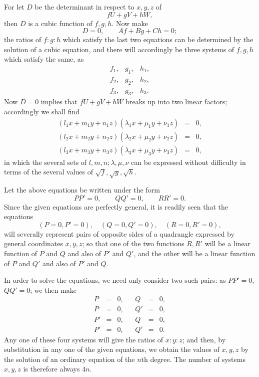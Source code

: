 \documentclass[11pt]{article}
\newcommand{\sourcepage}[1]{\marginpar{\scriptsize p.~#1}}
\begin{document}
{{For let $D$ be the determinant in respect to $x,y,z$ of
\[
 fU+gV+hW,
\]
then $D$ is a cubic function of $f,g,h$. Now make
\[
 D=0,\qquad Af+Bg+Ch=0;
\]
the ratios of $f:g:h$ which satisfy the last two equations can be determined by the solution of a cubic equation, and there will accordingly be three systems of $f,g,h$ which satisfy the same, as
\[
\begin{array}{ccc}
 f_1,&g_1,&h_1,\\
 f_2,&g_2,&h_2,\\
 f_3,&g_3,&h_3.
\end{array}
\]
Now $D=0$ implies that $fU+gV+hW$ breaks up into two linear factors; accordingly we shall find
\[
\begin{array}{rcl}
(l_1x+m_1y+n_1z)(\lambda_1x+\mu_1y+\nu_1z)&=&0,\\
(l_2x+m_2y+n_2z)(\lambda_2x+\mu_2y+\nu_2z)&=&0,\\
(l_3x+m_3y+n_3z)(\lambda_3x+\mu_3y+\nu_3z)&=&0,
\end{array}
\]
\sourcepage{153}
in which the several sets of $l,m,n;\lambda,\mu,\nu$ can be expressed without difficulty in terms of the several values of $\sqrt f,\sqrt g,\sqrt h$.

Let the above equations be written under the form
\[
 PP'=0,\qquad QQ'=0,\qquad RR'=0.
\]
Since the given equations are perfectly general, it is readily seen that the equations
\[
(P=0,P'=0),\quad (Q=0,Q'=0),\quad (R=0,R'=0),
\]
will severally represent pairs of opposite sides of a quadrangle expressed by general coordinates $x,y,z$; so that one of the two functions $R,R'$ will be a linear function of $P$ and $Q$ and also of $P'$ and $Q'$, and the other will be a linear function of $P$ and $Q'$ and also of $P'$ and $Q$.

In order to solve the equations, we need only consider two such pairs: as $PP'=0$, $QQ'=0$; we then make
\[
\begin{array}{rclcrcl}
P&=&0,&& Q&=&0,\\
P&=&0,&& Q'&=&0,\\
P'&=&0,&& Q&=&0,\\
P'&=&0,&& Q'&=&0.
\end{array}
\]
Any one of these four systems will give the ratios of $x:y:z$; and then, by substitution in any one of the given equations, we obtain the values of $x,y,z$ by the solution of an ordinary equation of the $n$th degree. The number of systems $x,y,z$ is therefore always $4n$.

}}
\end{document}
